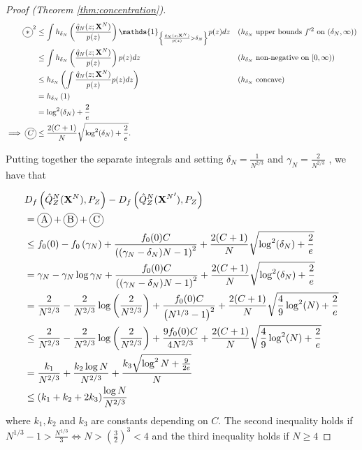 \begin{proof}[Proof (Theorem \ref{thm:concentration})]
\begin{align*}
    \encircle{$*$}^2
    &\leq \int h_{\delta_N}\left(\frac{\hat{q}_N(z;\XN)}{p(z)} \right) \mathds{1}_{\left\lbrace \frac{\hat{q}_N(z;\XN)}{p(z)} > \delta_N \right\rbrace} p(z) dz
    && \text{($h_{\delta_N}$ upper bounds $f'^2$ on $(\delta_N, \infty)$)}
    \\
    &\leq \int h_{\delta_N}\left(\frac{\hat{q}_N(z;\XN)}{p(z)} \right) p(z) dz
    && \text{($h_{\delta_N}$ non-negative on $[0, \infty)$)}
    \\
    &\leq  h_{\delta_N}\left( \int \frac{\hat{q}_N(z;\XN)}{p(z)} p(z) dz \right) 
    && \text{($h_{\delta_N}$ concave)}
    \\
    &= h_{\delta_N}\left( 1\right) \\
    &= \log^2(\delta_N) + \frac{2}{e}\\
    \implies \encircle{$C$} &\leq \frac{2(C+1)}{N}\sqrt{\log^2(\delta_N) + \frac{2}{e}}.
\end{align*}


Putting together the separate integrals and setting $\delta_N = \frac{1}{N^{2/3}}$ and $\gamma_N = \frac{2}{N^{2/3}}$ , we have that

\begin{align*}
    &D_f\left( \hat{Q}_Z^N(\XN) , P_Z\right) - D_f\left( \hat{Q}_Z^N({\XN}') , P_Z\right) \\
    &= \encircle{A} + \encircle{B} + \encircle{C} \\
    &\leq f_0(0) - f_0\left(\gamma_N\right) +  \frac{f_0(0)C}{\left((\gamma_N-\delta_N)N - 1\right)^2} + \frac{2(C+1)}{N} \sqrt{\log^2(\delta_N) + \frac{2}{e} } \\
    &= \gamma_N - \gamma_N \log \gamma_N + \frac{f_0(0)C}{\left((\gamma_N-\delta_N)N - 1\right)^2} + \frac{2(C+1)}{N}  \sqrt{\log^2(\delta_N) + \frac{2}{e}}\\
    &=\frac{2}{N^{2/3}} - \frac{2}{N^{2/3}} \log\left(\frac{2}{N^{2/3}} \right) + \frac{f_0(0)C}{\left(N^{1/3} - 1\right)^2} + \frac{2(C+1)}{N} \sqrt{\frac{4}{9}\log^2(N) + \frac{2}{e}} 
    \\
    &\leq\frac{2}{N^{2/3}} - \frac{2}{N^{2/3}} \log\left(\frac{2}{N^{2/3}} \right) + \frac{9f_0(0)C}{4N^{2/3}} + \frac{2(C+1)}{N} \sqrt{\frac{4}{9}\log^2(N) + \frac{2}{e}} 
    \\
    &= \frac{k_1}{N^{2/3}} + \frac{k_2 \log N}{N^{2/3}} + \frac{k_3 \sqrt{\log^2N + \frac{9}{2e}}}{N}\\
    &\leq (k_1+k_2+2k_3)\frac{\log N}{N^{2/3}}
\end{align*}
where $k_1, k_2$ and $k_3$ are constants depending on $C$.
The second inequality holds if $N^{1/3}-1 > \frac{N^{1/3}}{3} \iff N>\left(\frac{3}{2}\right)^3 < 4$ and the third inequality holds if $N\geq 4$


\end{proof}
